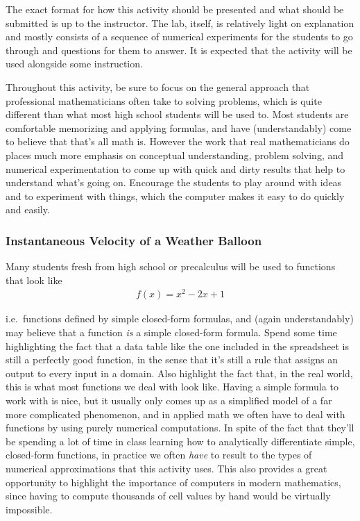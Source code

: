 The exact format for how this activity should be presented and what should be submitted is up to the instructor. The lab, itself, is relatively light on explanation and mostly consists of a sequence of numerical experiments for the students to go through and questions for them to answer. It is expected that the activity will be used alongside some instruction.

Throughout this activity, be sure to focus on the general approach that professional mathematicians often take to solving problems, which is quite different than what most high school students will be used to. Most students are comfortable memorizing and applying formulas, and have (understandably) come to believe that that's all math is. However the work that real mathematicians do places much more emphasis on conceptual understanding, problem solving, and numerical experimentation to come up with quick and dirty results that help to understand what's going on. Encourage the students to play around with ideas and to experiment with things, which the computer makes it easy to do quickly and easily.

\subsubsection*{Instantaneous Velocity of a Weather Balloon}

Many students fresh from high school or precalculus will be used to functions that look like
\begin{align*}
	f(x) = x^2 - 2x + 1
\end{align*}

i.e.~functions defined by simple closed-form formulas, and (again understandably) may believe that a function \textit{is} a simple closed-form formula. Spend some time highlighting the fact that a data table like the one included in the spreadsheet is still a perfectly good function, in the sense that it's still a rule that assigns an output to every input in a domain. Also highlight the fact that, in the real world, this is what most functions we deal with look like. Having a simple formula to work with is nice, but it usually only comes up as a simplified model of a far more complicated phenomenon, and in applied math we often have to deal with functions by using purely numerical computations. In spite of the fact that they'll be spending a lot of time in class learning how to analytically differentiate simple, closed-form functions, in practice we often \textit{have} to result to the types of numerical approximations that this activity uses. This also provides a great opportunity to highlight the importance of computers in modern mathematics, since having to compute thousands of cell values by hand would be virtually impossible.

